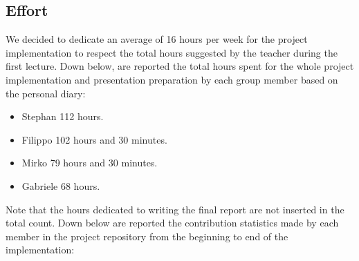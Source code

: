 \subsection{Effort}
We decided to dedicate an average of 16 hours per week for the project implementation to respect the total hours suggested by the teacher during the first lecture.\newline
Down below, are reported the total hours spent for the whole project implementation and presentation preparation by each group member based on the personal diary:
\begin{itemize}
  \item Stephan 112 hours.
  \item Filippo 102 hours and 30 minutes.
  \item Mirko 79 hours and 30 minutes.
  \item Gabriele 68 hours.
\end{itemize}
Note that the hours dedicated to writing the final report are not inserted in the total count.\newline
Down below are reported the contribution statistics made by each member in the project repository from the beginning to end of the implementation:
